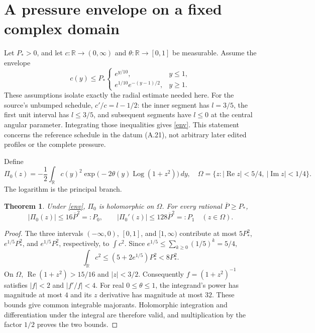 \documentclass[11pt]{article}
\newtheorem{theorem}{Theorem}
\begin{document}
\section{A pressure envelope on a fixed complex domain}
Let $P_*>0$, and let $c:\mathbb R\to(0,\infty)$ and
$\theta:\mathbb R\to[0,1]$ be measurable. Assume the envelope
\begin{equation}\label{env}
c(y)\le P_*\begin{cases}
e^{y/10},&y\le 1,\\
e^{1/10}e^{-(y-1)/2},&y\ge1.
\end{cases}
\end{equation}
These assumptions isolate exactly the radial estimate needed here.
For the source's unbumped schedule, $c'/c=l-1/2$: the inner segment has
$l=3/5$, the first unit interval has $l\le3/5$, and subsequent segments
have $l\le0$ at the central angular parameter. Integrating those inequalities
gives \eqref{env}. This statement concerns the reference schedule in the
datum (A.21), not arbitrary later edited profiles or the complete pressure.

Define
\begin{equation}\label{pressure}
\Pi_0(z)=-\frac12\int_{\mathbb R}c(y)^2
\exp\bigl(-2\theta(y)\operatorname{Log}(1+z^2)\bigr)\,dy,
\quad
\Omega=\{z:|\operatorname{Re}z|<5/4,\ |\operatorname{Im}z|<1/4\}.
\end{equation}
The logarithm is the principal branch.

\begin{theorem}\label{thmpressure}
Under \eqref{env}, $\Pi_0$ is holomorphic on $\Omega$. For every rational
$\overline P\ge P_*$,
\[
|\Pi_0(z)|\le16\overline P^2=:P_0,
\qquad |\Pi_0'(z)|\le128\overline P^2=:P_1
\quad(z\in\Omega).
\]
\end{theorem}
\begin{proof}
The three intervals $(-\infty,0)$, $[0,1]$, and $[1,\infty)$ contribute
at most $5P_*^2$, $e^{1/5}P_*^2$, and $e^{1/5}P_*^2$, respectively, to
$\int c^2$. Since $e^{1/5}\le\sum_{k\ge0}(1/5)^k=5/4$,
\[
\int_{\mathbb R}c^2\le(5+2e^{1/5})P_*^2<8P_*^2.
\]
On $\Omega$, $\operatorname{Re}(1+z^2)>15/16$ and $|z|<3/2$.
Consequently $f=(1+z^2)^{-1}$ satisfies $|f|<2$ and $|f'/f|<4$.
For real $0\le\theta\le1$, the integrand's power has magnitude at most
$4$ and its $z$ derivative has magnitude at most $32$.
These bounds give common integrable majorants. Holomorphic integration and
differentiation under the integral are therefore valid, and multiplication
by the factor $1/2$ proves the two bounds.
\end{proof}
\end{document}
